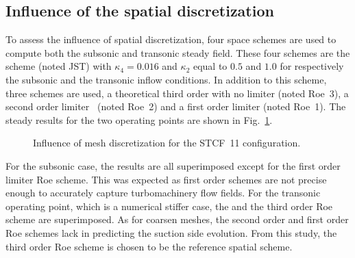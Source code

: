 \subsection{Influence of the spatial discretization}
To assess the influence of spatial discretization, four space schemes are
used to compute both the subsonic and transonic steady field. These
four schemes are the \citet{Jameson1981} scheme (noted JST) with $\kappa_4 = 0.016$
and $\kappa_2$ equal to $0.5$ and $1.0$ for respectively the subsonic and the transonic
inflow conditions. In addition to this scheme, three \citet{Roe1981} schemes are used,
a theoretical third order with no limiter (noted Roe~3), a second order limiter~\cite{Roe1981} (noted Roe~2)
and a first order limiter (noted Roe~1).
The steady results for the two operating points are shown 
in Fig.~\ref{fig:stcf11_space_scheme_convergence}.
\begin{figure}[htb]
  \centering
  \caption{Influence of mesh discretization for the STCF~11 configuration.}
  \label{fig:stcf11_space_scheme_convergence}
\end{figure}
For the subsonic case, the results are all superimposed except for the first 
order limiter Roe scheme. This was expected as first order schemes
are not precise enough to accurately capture turbomachinery flow fields.
For the transonic operating point, which is a numerical stiffer case,
the \citet{Jameson1981} and the third order Roe scheme are superimposed.
As for coarsen meshes, the second order and first order Roe schemes
lack in predicting the suction side evolution. From this study,
the third order Roe scheme is chosen to be the reference spatial scheme.
